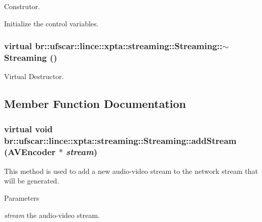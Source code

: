 Construtor. 

Initialize the control variables. \hypertarget{classbr_1_1ufscar_1_1lince_1_1xpta_1_1streaming_1_1Streaming_a9813a24dd86dd3a4424f39d139563170}{
\subsubsection[{$\sim$Streaming}]{\setlength{\rightskip}{0pt plus 5cm}virtual br::ufscar::lince::xpta::streaming::Streaming::$\sim$Streaming ()}}
\label{classbr_1_1ufscar_1_1lince_1_1xpta_1_1streaming_1_1Streaming_a9813a24dd86dd3a4424f39d139563170}


Virtual Destructor. 



\subsection{Member Function Documentation}
\hypertarget{classbr_1_1ufscar_1_1lince_1_1xpta_1_1streaming_1_1Streaming_aec5910b2e3d8c442c16b08ee4717cad5}{
\subsubsection[{addStream}]{\setlength{\rightskip}{0pt plus 5cm}virtual void br::ufscar::lince::xpta::streaming::Streaming::addStream ({\bf AVEncoder} $\ast$ {\em stream})}}
\label{classbr_1_1ufscar_1_1lince_1_1xpta_1_1streaming_1_1Streaming_aec5910b2e3d8c442c16b08ee4717cad5}


This method is used to add a new audio-\/video stream to the network stream that will be generated. 


\begin{DoxyParams}{Parameters}
\item[{\em stream}]the audio-\/video stream. \end{DoxyParams}


